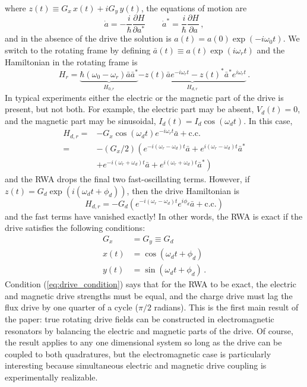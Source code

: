 where $z(t) \equiv G_x \, x(t) + i G_y \, y(t)$, the equations of motion are
\begin{equation}
  \dot{a} = -\frac{i}{\hbar} \frac{\partial H}{\partial a^*}
  \qquad
  \dot{a}^* = \frac{i}{\hbar} \frac{\partial H}{\partial a}
  \, ,
\end{equation}
and in the absence of the drive the solution is $a(t) = a(0) \exp(-i \omega_0 t)$.
We switch to the rotating frame by defining $\bar{a}(t) \equiv a(t) \exp(i \omega_r t)$ and the Hamiltonian in the rotating frame is
\begin{equation}
  H_r
  =
  \underbrace{\hbar(\omega_0 - \omega_r) \bar{a}\bar{a}^*}_{H_{0,r}}
  \underbrace{- z(t) \bar{a} e^{-i \omega_r t} - z(t)^* \bar{a}^* e^{i \omega_r t}}_{H_{d,r}} \, .
\end{equation}
In typical experiments either the electric or the magnetic part of the drive is present, but not both.
For example, the electric part may be absent, $V_d(t) = 0$, and the magnetic part may be sinusoidal, $I_d(t) = I_d \cos(\omega_d t)$.
In this case,
\begin{align}
  H_{d,r}
  =& - G_x \cos(\omega_d t) e^{-i \omega_r t} \bar{a} + \text{c.c.} \nonumber \\
  =& - (G_x / 2)
  \left(
    e^{-i(\omega_r - \omega_d)t} \bar{a} + e^{i(\omega_r - \omega_d)t} \bar{a}^*
  \right. \nonumber \\
  & \left.
   + e^{-i(\omega_r + \omega_d)t} \bar{a} + e^{i(\omega_r + \omega_d)t} \bar{a}^*
  \right)
\end{align}
and the RWA drops the final two fast-oscillating terms.
However, if $z(t) = G_d \exp(i (\omega_d t + \phi_d))$, then the drive Hamiltonian is
\begin{equation}
  H_{d,r} = - G_d \left( e^{-i ( \omega_r - \omega_d)t} e^{i \phi_d} \bar{a} + \text{c.c.} \right)
\end{equation}
and the fast terms have vanished exactly!
In other words, the RWA is exact if the drive satisfies the following conditions:
\begin{align}
  G_x &= G_y \equiv G_d \nonumber \\
  x(t) &= \cos(\omega_d t + \phi_d) \nonumber \\
  y(t) &= \sin(\omega_d t + \phi_d) \, . \label{eq:drive_condition}
\end{align}
Condition (\ref{eq:drive_condition}) says that for the RWA to be exact, the electric and magnetic drive strengths must be equal, and the charge drive must lag the flux drive by one quarter of a cycle ($\pi/2$ radians).
This is the first main result of the paper: true rotating drive fields can be constructed in electromagnetic resonators by balancing the electric and magnetic parts of the drive.
Of course, the result applies to any one dimensional system so long as the drive can be coupled to both quadratures, but the electromagnetic case is particularly interesting because simultaneous electric and magnetic drive coupling is experimentally realizable.

